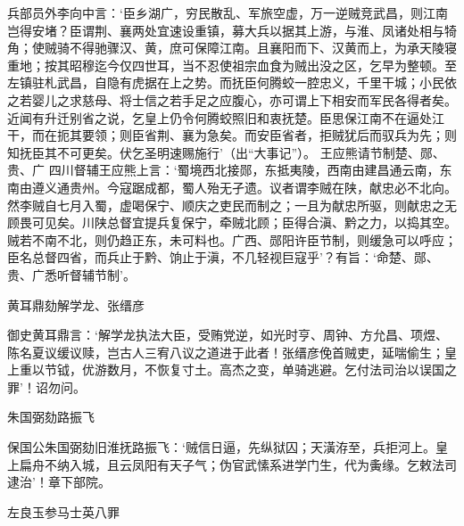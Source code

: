 \documentclass[]{article}
\begin{document}
兵部员外李向中言：`臣乡湖广，穷民散乱、军旅空虚，万一逆贼竞武昌，则江南岂得安堵？臣谓荆、襄两处宜速设重镇，募大兵以据其上游，与淮、凤诸处相与犄角；使贼骑不得驰骤汉、黄，庶可保障江南。且襄阳而下、汉黄而上，为承天陵寝重地；按其昭穆迄今仅四世耳，当不忍使祖宗血食为贼出没之区，乞早为整顿。至左镇驻札武昌，自隐有虎据在上之势。而抚臣何腾蛟一腔忠义，千里干城；小民依之若婴儿之求慈母、将士信之若手足之应腹心，亦可谓上下相安而军民各得者矣。近闻有升迁别省之说，乞皇上仍令何腾蛟照旧和衷抚楚。臣思保江南不在逼处江干，而在扼其要领；则臣省荆、襄为急矣。而安臣省者，拒贼犹后而驭兵为先；则知抚臣其不可更矣。伏乞圣明速赐施行'（出``大事记''）。
王应熊请节制楚、郧、贵、广
四川督辅王应熊上言：`蜀境西北接郧，东抵夷陵，西南由建昌通云南，东南由遵义通贵州。今寇踞成都，蜀人殆无孑遗。议者谓李贼在陕，献忠必不北向。然李贼自七月入蜀，虚喝保宁、顺庆之吏民而制之；一且为献忠所驱，则献忠之无顾畏可见矣。川陕总督宜提兵复保宁，牵贼北顾；臣得合滇、黔之力，以捣其空。贼若不南不北，则仍趋正东，未可料也。广西、郧阳许臣节制，则缓急可以呼应；臣名总督四省，而兵止于黔、饷止于滇，不几轻视巨寇乎'？有旨：`命楚、郧、贵、广悉听督辅节制'。

黄耳鼎劾解学龙、张缙彦

御史黄耳鼎言：`解学龙执法大臣，受贿党逆，如光时亨、周钟、方允昌、项煜、陈名夏议缓议赎，岂古人三宥八议之道进于此者！张缙彦俛首贼吏，延喘偷生；皇上重以节钺，优游数月，不恢复寸土。高杰之变，单骑逃避。乞付法司治以误国之罪'！诏勿问。

朱国弼劾路振飞

保国公朱国弼劾旧淮抚路振飞：`贼信日逼，先纵狱囚；天潢洊至，兵拒河上。皇上扁舟不纳入城，且云凤阳有天子气；伪官武愫系进学门生，代为夤缘。乞敕法司逮治'！章下部院。

左良玉参马士英八罪
\end{document}
